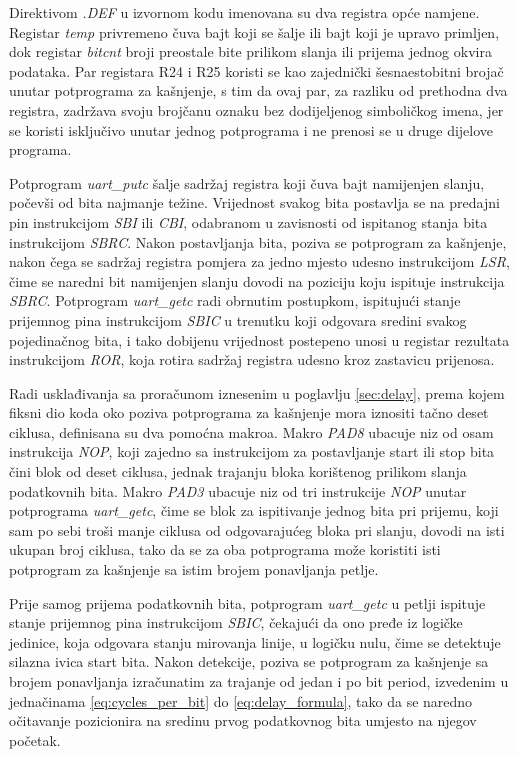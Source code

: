 Direktivom \emph{.DEF} u izvornom kodu imenovana su dva registra opće
namjene. Registar \emph{temp} privremeno čuva bajt koji se šalje ili
bajt koji je upravo primljen, dok registar \emph{bitcnt} broji preostale
bite prilikom slanja ili prijema jednog okvira podataka. Par registara
R24 i R25 koristi se kao zajednički šesnaestobitni brojač unutar
potprograma za kašnjenje, s tim da ovaj par, za razliku od prethodna
dva registra, zadržava svoju brojčanu oznaku bez dodijeljenog
simboličkog imena, jer se koristi isključivo unutar jednog potprograma
i ne prenosi se u druge dijelove programa.

Potprogram \emph{uart\_putc} šalje sadržaj registra koji čuva bajt namijenjen
slanju, počevši od bita najmanje težine. Vrijednost svakog bita
postavlja se na predajni pin instrukcijom \emph{SBI} ili \emph{CBI},
odabranom u zavisnosti od ispitanog stanja bita instrukcijom \emph{SBRC}. Nakon
postavljanja bita, poziva se potprogram za kašnjenje, nakon čega se
sadržaj registra pomjera za jedno mjesto udesno instrukcijom \emph{LSR}, čime se
naredni bit namijenjen slanju dovodi na poziciju koju ispituje instrukcija
\emph{SBRC}. Potprogram \emph{uart\_getc} radi obrnutim postupkom, ispitujući
stanje prijemnog pina instrukcijom \emph{SBIC} u trenutku koji odgovara sredini
svakog pojedinačnog bita, i tako dobijenu vrijednost postepeno unosi u
registar rezultata instrukcijom \emph{ROR}, koja rotira sadržaj registra
udesno kroz zastavicu prijenosa.

Radi usklađivanja sa proračunom iznesenim u poglavlju \ref{sec:delay},
prema kojem fiksni dio koda oko poziva potprograma za kašnjenje mora
iznositi tačno deset ciklusa, definisana su dva pomoćna makroa. Makro
\emph{PAD8} ubacuje niz od osam instrukcija \emph{NOP}, koji zajedno sa
instrukcijom za postavljanje start ili stop bita čini blok od deset
ciklusa, jednak trajanju bloka korištenog prilikom slanja podatkovnih
bita. Makro \emph{PAD3} ubacuje niz od tri instrukcije \emph{NOP} unutar
potprograma \emph{uart\_getc}, čime se blok za ispitivanje jednog bita
pri prijemu, koji sam po sebi troši manje ciklusa od odgovarajućeg
bloka pri slanju, dovodi na isti ukupan broj ciklusa, tako da se za oba
potprograma može koristiti isti potprogram za kašnjenje sa istim
brojem ponavljanja petlje.

Prije samog prijema podatkovnih bita, potprogram \emph{uart\_getc} u
petlji ispituje stanje prijemnog pina instrukcijom \emph{SBIC}, čekajući
da ono pređe iz logičke jedinice, koja odgovara stanju mirovanja linije,
u logičku nulu, čime se detektuje silazna ivica start bita. Nakon
detekcije, poziva se potprogram za kašnjenje sa brojem ponavljanja
izračunatim za trajanje od jedan i po bit period, izvedenim u
jednačinama \ref{eq:cycles_per_bit} do \ref{eq:delay_formula}, tako da
se naredno očitavanje pozicionira na sredinu prvog podatkovnog bita
umjesto na njegov početak.

